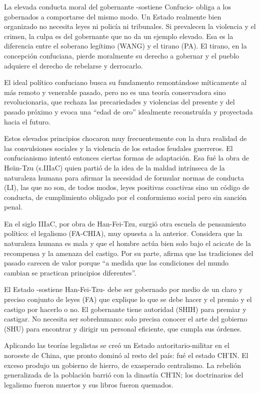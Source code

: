 \documentclass[
]{book}
\begin{document}
La elevada conducta moral del gobernante -sostiene Confucio- obliga a los gobernados a comportarse del mismo modo. Un Estado realmente bien organizado no necesita leyes ni policía ni tribunales. Si prevalecen la violencia y el crimen, la culpa es del gobernante que no da un ejemplo elevado. Esa es la diferencia entre el soberano legítimo (WANG) y el tirano (PA). El tirano, en la concepción confuciana, pierde moralmente su derecho a gobernar y el pueblo adquiere el derecho de rebelarse y derrocarlo.

El ideal político confuciano busca su fundamento remontándose míticamente al más remoto y venerable pasado, pero no es una teoría conservadora sino revolucionaria, que rechaza las precariedades y violencias del presente y del pasado próximo y evoca una ``edad de oro'' idealmente reconstruída y proyectada hacia el futuro.

Estos elevados principios chocaron muy frecuentemente con la dura realidad de las convulsiones sociales y la violencia de los estados feudales guerreros. El confucianismo intentó entonces ciertas formas de adaptación. Esa fué la obra de Hsün-Tzu (s.IIIaC) quien partió de la idea de la maldad intrínseca de la naturaleza humana para afirmar la necesidad de formular normas de conducta (LI), las que no son, de todos modos, leyes positivas coactivas sino un código de conducta, de cumplimiento obligado por el conformismo social pero sin sanción penal.

En el siglo IIIaC, por obra de Han-Fei-Tzu, surgió otra escuela de pensamiento político: el legalismo (FA-CHIA), muy opuesta a la anterior. Considera que la naturaleza humana es mala y que el hombre actúa bien solo bajo el acicate de la recompensa y la amenaza del castigo. Por su parte, afirma que las tradiciones del pasado carecen de valor porque ``a medida que las condiciones del mundo cambian se practican principios diferentes''.

El Estado -sostiene Han-Fei-Tzu- debe ser gobernado por medio de un claro y preciso conjunto de leyes (FA) que explique lo que se debe hacer y el premio y el castigo por hacerlo o no. El gobernante tiene autoridad (SHIH) para premiar y castigar. No necesita ser sobrehumano: solo precisa conocer el arte del gobierno (SHU) para encontrar y dirigir un personal eficiente, que cumpla sus órdenes.

Aplicando las teorías legalistas se creó un Estado autoritario-militar en el noroeste de China, que pronto dominó al resto del país: fué el estado CH'IN. El exceso produjo un gobierno de hierro, de exasperado centralismo. La rebelión generalizada de la población barrió con la dinastía CH'IN; los doctrinarios del legalismo fueron muertos y sus libros fueron quemados.
\end{document}

